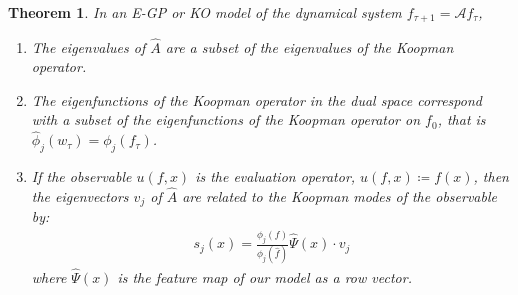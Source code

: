 \documentclass[letterpaper,12pt,peerreviewca,draftcls]{IEEEtran}
\newtheorem{theorem}{Theorem}%
\newcommand{\weight}{w}
\newcommand{\sysop}{\mathcal{A}}
\newcommand{\fspaceEl}{f}
\newcommand{\fspaceApproxEl}{\widehat{\fspaceEl}}
\newcommand{\obsMatRow}{\widehat{\Psi}}
\newcommand{\dualop}{A}
\newcommand{\dualopApprox}{\widehat{\dualop}}
\newcommand{\tindex}{\tau}
\begin{document}
\begin{theorem}\label{thm:DualApproxModes}
	In an E-GP or KO model of the dynamical system $ f_{\tindex+1} = \sysop f_{\tindex}$,
	\begin{enumerate}
		\item The eigenvalues of $\dualopApprox$ are a subset of the eigenvalues of the Koopman operator.
		\item The eigenfunctions of the Koopman operator in the dual space correspond with a subset of the eigenfunctions of the Koopman operator on $\fspaceEl_0$, that is $\hat\phi_j(\weight_{\tindex}) = \phi_j(f_{\tindex})$.
		\item If the observable $u(\fspaceEl,x)$ is the evaluation operator, $u(\fspaceEl,x) \coloneqq \fspaceEl(x)$, then the eigenvectors $v_j$ of $\dualopApprox$ are related to the Koopman modes of the observable by:
		\begin{align}
			s_j (x) = \frac{\phi_j(\fspaceEl)}{\phi_j(\fspaceApproxEl)} \obsMatRow(x) \cdot v_j
		\end{align}
		where $\obsMatRow(x)$ is the feature map of our model as a row vector.
	\end{enumerate} 
\end{theorem}
\end{document}
